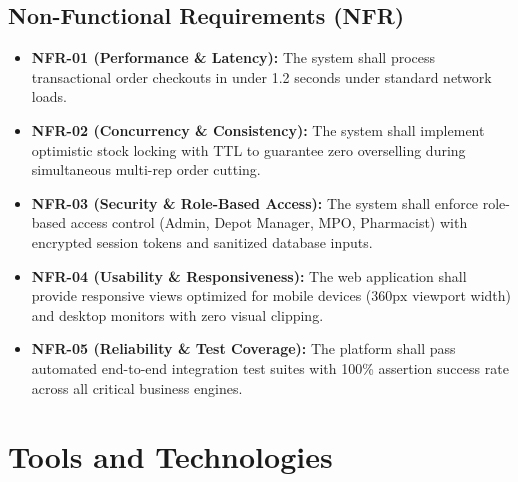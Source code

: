 \documentclass[12pt,a4paper]{article}
\begin{document}
\subsection{Non-Functional Requirements (NFR)}
\begin{itemize}
    \item \textbf{NFR-01 (Performance \& Latency):} The system shall process transactional order checkouts in under 1.2 seconds under standard network loads.
    \item \textbf{NFR-02 (Concurrency \& Consistency):} The system shall implement optimistic stock locking with TTL to guarantee zero overselling during simultaneous multi-rep order cutting.
    \item \textbf{NFR-03 (Security \& Role-Based Access):} The system shall enforce role-based access control (Admin, Depot Manager, MPO, Pharmacist) with encrypted session tokens and sanitized database inputs.
    \item \textbf{NFR-04 (Usability \& Responsiveness):} The web application shall provide responsive views optimized for mobile devices ($360\text{px}$ viewport width) and desktop monitors with zero visual clipping.
    \item \textbf{NFR-05 (Reliability \& Test Coverage):} The platform shall pass automated end-to-end integration test suites with 100\% assertion success rate across all critical business engines.
\end{itemize}

\section{Tools and Technologies}
\end{document}
